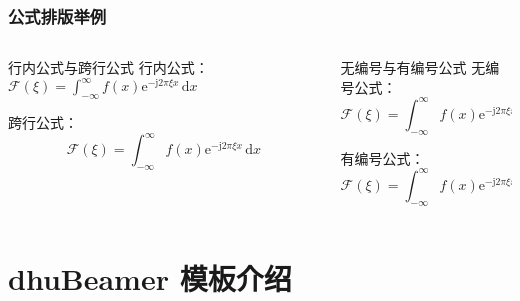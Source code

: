 \documentclass[12pt]{beamer}
\begin{document}
\begin{frame}[t]
    \frametitle{公式排版举例}

    \begin{columns}[T,onlytextwidth]
        \begin{column}{0.48\textwidth}
            \begin{block}{行内公式与跨行公式}
                行内公式：$\mathcal{F}(\xi)=\int_{-\infty}^{\infty} f(x)\mathrm{e}^{-\mathrm{j}2\pi
                \xi x}\,\mathrm{d}x$

                跨行公式：
                $$
                \mathcal{F}(\xi)=\int_{-\infty}^{\infty} f(x)\mathrm{e}^{-\mathrm{j}2\pi\xi x}\,\mathrm{d}x
                $$
            \end{block}
        \end{column}
        
        \begin{column}{0.48\textwidth}
            \begin{block}{无编号与有编号公式}
                无编号公式：
                \begin{equation*}
                    \mathcal{F}(\xi)=\int_{-\infty}^{\infty} f(x)\mathrm{e}^{-\mathrm{j}2\pi
                    \xi x}\,\mathrm{d}x
                \end{equation*}

                有编号公式：
                \begin{equation}
                    \mathcal{F}(\xi)=\int_{-\infty}^{\infty} f(x)\mathrm{e}^{-\mathrm{j}2\pi
                    \xi x}\,\mathrm{d}x
                \end{equation}
            \end{block}
        \end{column}
    \end{columns}
\end{frame}

\section{dhuBeamer 模板介绍}
\end{document}
